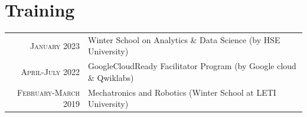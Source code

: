 \documentclass[a4paper,10pt]{article} %
\begin{document}
\section{Training}
\begin{tabular}{rp{10cm}}
	\vspace*{5.33pt}
    \textsc{January} 2023 & Winter School on Analytics \& Data Science \footnotesize(by HSE University)\normalsize \\
	\vspace*{5.33pt}
    \textsc{April-July} 2022 & GoogleCloudReady Facilitator Program \footnotesize(by Google cloud \& Qwiklabs)\normalsize\\

    \textsc{February-March} 2019 & Mechatronics and Robotics \footnotesize(Winter School at LETI University)\normalsize

    \end{tabular}
\end{document}
